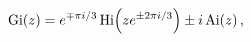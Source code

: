 \[\mathop{\mathrm{Gi}\/}\nolimits\!\left(z\right)=e^{\mp\pi i/3}\mathop{\mathrm{%
Hi}\/}\nolimits\!\left(ze^{\pm 2\pi i/3}\right)\pm i\mathop{\mathrm{Ai}\/}%
\nolimits\!\left(z\right),\]